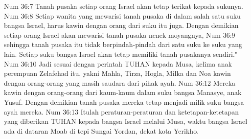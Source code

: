 Num 36:7  Tanah pusaka setiap orang Israel akan tetap terikat kepada sukunya.
Num 36:8  Setiap wanita yang mewarisi tanah pusaka di dalam salah satu suku bangsa Israel, harus kawin dengan orang dari suku itu juga. Dengan demikian setiap orang Israel akan mewarisi tanah pusaka nenek moyangnya,
Num 36:9  sehingga tanah pusaka itu tidak berpindah-pindah dari satu suku ke suku yang lain. Setiap suku bangsa Israel akan tetap memiliki tanah pusakanya sendiri."
Num 36:10  Jadi sesuai dengan perintah TUHAN kepada Musa, kelima anak perempuan Zelafehad itu, yakni Mahla, Tirza, Hogla, Milka dan Noa kawin dengan orang-orang yang masih saudara dari pihak ayah.
Num 36:12  Mereka kawin dengan orang-orang dari kaum-kaum dalam suku bangsa Manasye, anak Yusuf. Dengan demikian tanah pusaka mereka tetap menjadi milik suku bangsa ayah mereka.
Num 36:13  Itulah peraturan-peraturan dan ketetapan-ketetapan yang diberikan TUHAN kepada bangsa Israel melalui Musa, waktu bangsa Israel ada di dataran Moab di tepi Sungai Yordan, dekat kota Yerikho.


